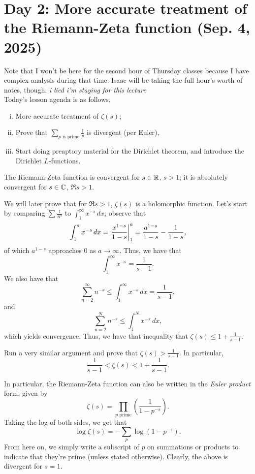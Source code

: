 \section{Day 2: More accurate treatment of the Riemann-Zeta function (Sep. 4, 2025)}
Note that I won't be here for the second hour of Thursday classes because I have complex analysis during that time. Isaac will be taking the full hour's worth of notes, though. \textit{i lied i'm staying for this lecture}
\\[8pt]
Today's lesson agenda is as follows,
\begin{enumerate}[(i)]
    \item More accurate treatment of $\zeta(s)$;
    \item Prove that $\sum_{p \text{ is prime}} \frac{1}{p}$ is divergent (per Euler),
    \item Start doing preaptory material for the Dirichlet theorem, and introduce the Dirichlet $L$-functions.
\end{enumerate}
\begin{lemma}
    The Riemann-Zeta function is convergent for $s \in \mathbb R$, $s > 1$; it is absolutely convergent for $s \in \mathbb C$, $\Re s > 1$.
\end{lemma}
\noindent We will later prove that for $\Re s > 1$, $\zeta(s)$ is a holomorphic function. Let's start by comparing $\sum \frac{1}{n^s}$ to $\int_1^\infty x^{-s} \, dx$; observe that
\[ \int_1^a x^{-s} \, dx = \left.\frac{x^{1-s}}{1-s}\right\rvert_{1}^{a} = \frac{a^{1-s}}{1-s} - \frac{1}{1-s}, \]
of which $a^{1-s}$ approaches $0$ as $a \to \infty$. Thus, we have that
\[ \int_1^\infty x^{-s} = \frac{1}{s-1}. \]
We also have that
\[ \sum_{n=2}^\infty n^{-s} \leq \int_1^\infty x^{-s} \, dx = \frac{1}{s-1}, \]
and
\[ \sum_{n=2}^N n^{-s} \leq \int_1^N x^{-s} \, dx, \]
which yields convergence. Thus, we have that inequality that $\zeta(s) \leq 1 + \frac{1}{s-1}$.
\begin{exercise}
    Run a very similar argument and prove that $\zeta(s) > \frac{1}{s-1}$. In particular,
    \[ \frac{1}{s-1} < \zeta(s) < 1 + \frac{1}{s-1}. \]
\end{exercise}
\noindent In particular, the Riemann-Zeta function can also be written in the \textit{Euler product} form, given by
\[ \zeta(s) = \prod_{p \text{ prime}} \left(\frac{1}{1 - p^{-s}}\right). \]
Taking the log of both sides, we get that
\[ \log \zeta(s) = -\sum_p \log(1 - p^{-s}). \]
From here on, we simply write a subscript of $p$ on summations or products to indicate that they're prime (unless stated otherwise). Clearly, the above is divergent for $s = 1$.
